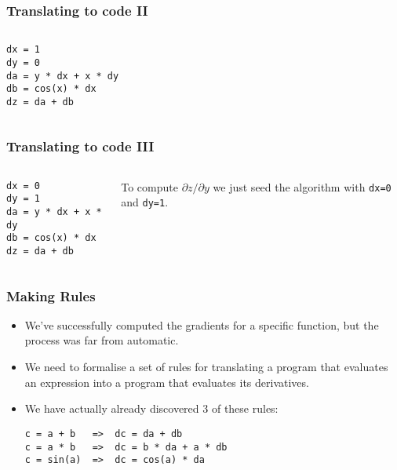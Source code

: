 \documentclass[\beamerclass]{beamer}
\begin{document}
\begin{frame}[fragile]
\frametitle{Translating to code II}

\begin{columns}
\begin{lstlisting}
dx = 1
dy = 0
da = y * dx + x * dy
db = cos(x) * dx
dz = da + db	
\end{lstlisting}


\end{columns}
\end{frame}


\begin{frame}[fragile]
\frametitle{Translating to code III}

\begin{columns}
\begin{lstlisting}
dx = 0
dy = 1
da = y * dx + x * dy
db = cos(x) * dx
dz = da + db	
\end{lstlisting}


To compute $\partial z/\partial y$ we just seed the algorithm with \lstinline!dx=0! and \lstinline!dy=1!.
\end{columns}
\end{frame}

\begin{frame}[fragile]
\frametitle{Making Rules}

\begin{itemize}
	\item<+-> We've successfully computed the gradients for a specific function, but the process was far from automatic. 
	\item<+-> We need to formalise a set of rules for translating a program that evaluates an expression into a program that evaluates its derivatives.
	\item<+-> We have actually already discovered 3 of these rules:
\begin{lstlisting}
c = a + b   =>  dc = da + db
c = a * b   =>  dc = b * da + a * db
c = sin(a)  =>  dc = cos(a) * da
\end{lstlisting}
\end{itemize}

\end{frame}
\end{document}
